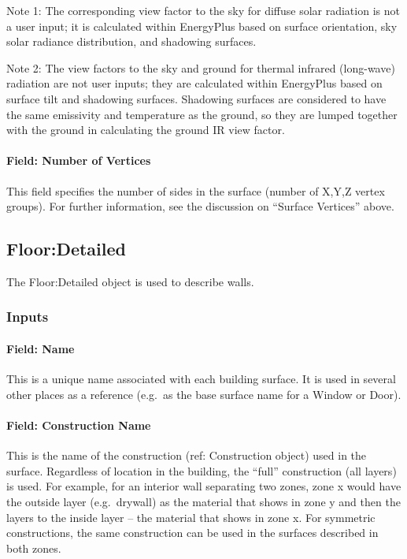 Note 1: The corresponding view factor to the sky for diffuse solar radiation is not a user input; it is calculated within EnergyPlus based on surface orientation, sky solar radiance distribution, and shadowing surfaces.

Note 2: The view factors to the sky and ground for thermal infrared (long-wave) radiation are not user inputs; they are calculated within EnergyPlus based on surface tilt and shadowing surfaces. Shadowing surfaces are considered to have the same emissivity and temperature as the ground, so they are lumped together with the ground in calculating the ground IR view factor.

\paragraph{Field: Number of Vertices}\label{field-number-of-vertices-1}

This field specifies the number of sides in the surface (number of X,Y,Z vertex groups). For further information, see the discussion on ``Surface Vertices'' above.

\subsection{Floor:Detailed}\label{floordetailed}

The Floor:Detailed object is used to describe walls.

\subsubsection{Inputs}\label{inputs-22-006}

\paragraph{Field: Name}\label{field-name-18-008}

This is a unique name associated with each building surface. It is used in several other places as a reference (e.g.~as the base surface name for a Window or Door).

\paragraph{Field: Construction Name}\label{field-construction-name-18}

This is the name of the construction (ref: Construction object) used in the surface. Regardless of location in the building, the ``full'' construction (all layers) is used. For example, for an interior wall separating two zones, zone x would have the outside layer (e.g.~drywall) as the material that shows in zone y and then the layers to the inside layer -- the material that shows in zone x. For symmetric constructions, the same construction can be used in the surfaces described in both zones.

